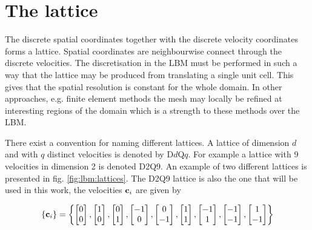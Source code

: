 \section{The lattice}\label{sec:lbm:lattice}
The discrete spatial coordinates together with the discrete velocity
coordinates forms a lattice. Spatial coordinates are neighbourwise
connect through the discrete velocities. The discretisation in the LBM
must be performed in such a way that the lattice may be produced from
translating a single unit cell. This gives that the spatial resolution
is constant for the whole domain. In other approaches, e.g. finite
element methods the mesh may locally be refined at interesting regions
of the domain which is a strength to these methods over the LBM.  

There exist a convention for naming different lattices. A lattice of
dimension $d$ and with $q$ distinct velocities is denoted by
D$d$Q$q$. For example a lattice with 9 velocities in dimension 2 is
denoted D2Q9. An example of two different lattices is presented in
fig. \ref{fig:lbm:lattices}. The D2Q9 lattice is also the one that
will be used in this work, the velocities $\mathbf{c}_i$ are given by

\begin{equation}\label{eq:lbm:d2q9_c}
\{\mathbf{c}_i\} = \left\{
\begin{bmatrix}0\\0\end{bmatrix}, 
\begin{bmatrix}1\\0\end{bmatrix}, 
\begin{bmatrix}0\\1\end{bmatrix}, 
\begin{bmatrix}-1\\0\end{bmatrix}, 
\begin{bmatrix}0\\-1\end{bmatrix}, 
\begin{bmatrix}1\\1\end{bmatrix}, 
\begin{bmatrix}-1\\1\end{bmatrix}, 
\begin{bmatrix}-1\\-1\end{bmatrix}, 
\begin{bmatrix}1\\-1\end{bmatrix}
\right\} 
\end{equation}

